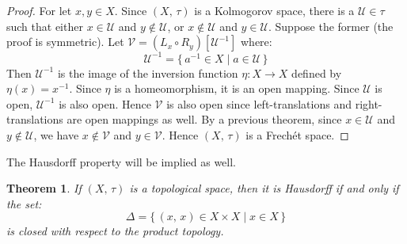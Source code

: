 \documentclass{article}
\theoremstyle{plain}
\newtheorem{theorem}{Theorem}[section]
\theoremstyle{normal}
\begin{document}
        \begin{proof}
            For let $x,y\in{X}$. Since $(X,\,\tau)$ is a Kolmogorov space, there
            is a $\mathcal{U}\in\tau$ such that either $x\in\mathcal{U}$ and
            $y\notin\mathcal{U}$, or $x\notin\mathcal{U}$ and
            $y\in\mathcal{U}$. Suppose the former (the proof is symmetric).
            Let $\mathcal{V}=(L_{x}\circ{R}_{y})[\mathcal{U}^{-1}]$ where:
            \begin{equation}
                \mathcal{U}^{-1}=\{\,a^{-1}\in{X}\;|\;a\in\mathcal{U}\,\}
            \end{equation}
            Then $\mathcal{U}^{-1}$ is the image of the inversion function
            $\eta:X\rightarrow{X}$ defined by $\eta(x)=x^{-1}$. Since
            $\eta$ is a homeomorphism, it is an open mapping. Since
            $\mathcal{U}$ is open, $\mathcal{U}^{-1}$ is also open. Hence
            $\mathcal{V}$ is also open since left-translations and
            right-translations are open mappings as well. By a previous theorem,
            since $x\in\mathcal{U}$ and $y\notin\mathcal{U}$, we have
            $x\notin\mathcal{V}$ and $y\in\mathcal{V}$. Hence
            $(X,\,\tau)$ is a Frech\'{e}t space.
        \end{proof}
        The Hausdorff property will be implied as well.
        \begin{theorem}
            If $(X,\,\tau)$ is a topological space, then it is Hausdorff if and
            only if the set:
            \begin{equation}
                \Delta=\{\,(x,\,x)\in{X}\times{X}\;|\;x\in{X}\,\}
            \end{equation}
            is closed with respect to the product topology.
        \end{theorem}
\end{document}
